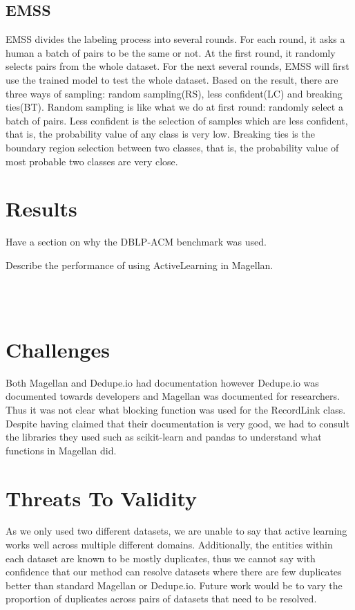 \documentclass[letterpaper,twocolumn,10pt]{article}
\begin{document}
\subsection{EMSS}
EMSS divides the labeling process into several rounds. For each round, it asks a human a batch of pairs to be the same or not. At the first round, it randomly selects pairs from the whole dataset. For the next several rounds, EMSS will first use the trained model to test the whole dataset. Based on the result, there are three ways of sampling: random sampling(RS), less confident(LC) and breaking ties(BT). Random sampling is like what we do at first round: randomly select a batch of pairs. Less confident is the selection of samples which are less confident, that is, the probability value of any class is very low. Breaking ties is the boundary region selection between two classes, that is, the probability value of most probable two classes are very close.

\section{Results}
Have a section on why the DBLP-ACM benchmark was used.

Describe the performance of using ActiveLearning in Magellan.


\noindent{}
\\\\

\section{Challenges}
Both Magellan and Dedupe.io had documentation however Dedupe.io was documented towards developers and Magellan was documented for researchers. Thus it was not clear what blocking function was used for the RecordLink class. Despite having claimed that their documentation is very good, we had to consult the libraries they used such as scikit-learn and pandas to understand what functions in Magellan did. 


\section{Threats To Validity}
As we only used two different datasets, we are unable to say that active learning works well across multiple different domains. Additionally, the entities within each dataset are known to be mostly duplicates, thus we cannot say with confidence that our method can resolve datasets where there are few duplicates better than standard Magellan or Dedupe.io. Future work would be to vary the proportion of duplicates across pairs of datasets that need to be resolved. 
\end{document}
